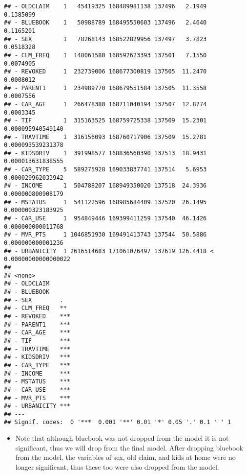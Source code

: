 \documentclass[
]{article}
\providecommand{\tightlist}{%
  \setlength{\itemsep}{0pt}\setlength{\parskip}{0pt}}
\begin{document}
\begin{verbatim}
## - OLDCLAIM    1   45419325 168489981138 137496   2.1949             0.1385099
## - BLUEBOOK    1   50988789 168495550603 137496   2.4640             0.1165201
## - SEX         1   78268143 168522829956 137497   3.7823             0.0518328
## - CLM_FREQ    1  148061580 168592623393 137501   7.1550             0.0074905
## - REVOKED     1  232739006 168677300819 137505  11.2470             0.0008012
## - PARENT1     1  234989770 168679551584 137505  11.3558             0.0007556
## - CAR_AGE     1  266478380 168711040194 137507  12.8774             0.0003345
## - TIF         1  315163525 168759725338 137509  15.2301     0.000095940549140
## - TRAVTIME    1  316156093 168760717906 137509  15.2781     0.000093539231378
## - KIDSDRIV    1  391998577 168836560390 137513  18.9431     0.000013631838555
## - CAR_TYPE    5  589275928 169033837741 137514   5.6953     0.000029962033942
## - INCOME      1  504788207 168949350020 137518  24.3936     0.000000800908179
## - MSTATUS     1  541122596 168985684409 137520  26.1495     0.000000323183925
## - CAR_USE     1  954849446 169399411259 137540  46.1426     0.000000000011768
## - MVR_PTS     1 1046851930 169491413743 137544  50.5886     0.000000000001236
## - URBANICITY  1 2616514683 171061076497 137619 126.4418 < 0.00000000000000022
##                 
## <none>          
## - OLDCLAIM      
## - BLUEBOOK      
## - SEX        .  
## - CLM_FREQ   ** 
## - REVOKED    ***
## - PARENT1    ***
## - CAR_AGE    ***
## - TIF        ***
## - TRAVTIME   ***
## - KIDSDRIV   ***
## - CAR_TYPE   ***
## - INCOME     ***
## - MSTATUS    ***
## - CAR_USE    ***
## - MVR_PTS    ***
## - URBANICITY ***
## ---
## Signif. codes:  0 '***' 0.001 '**' 0.01 '*' 0.05 '.' 0.1 ' ' 1
\end{verbatim}

\begin{itemize}
\tightlist
\item
  Note that although bluebook was not dropped from the model it is not
  significant, thus we will drop from the final model. After dropping
  bluebook from the model, the variables of sex, old claim, and kids at
  home were no longer significant, thus these too were also dropped from
  the model.
\end{itemize}
\end{document}
